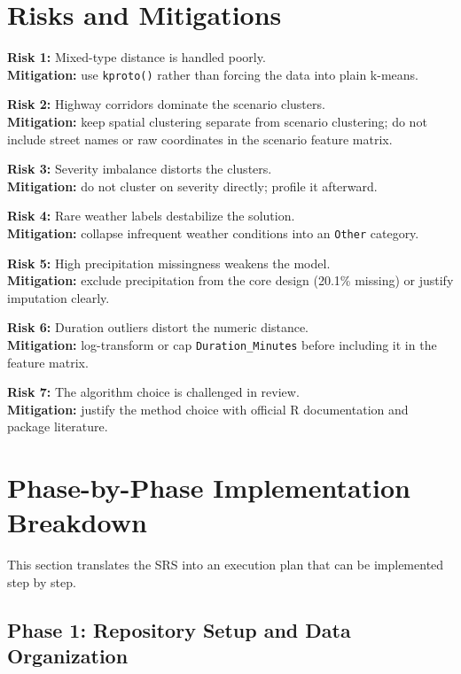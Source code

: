 \documentclass[11pt]{article}
\begin{document}
\section{Risks and Mitigations}

\textbf{Risk 1:} Mixed-type distance is handled poorly.\\
\textbf{Mitigation:} use \texttt{kproto()} rather than forcing the data into plain k-means.

\textbf{Risk 2:} Highway corridors dominate the scenario clusters.\\
\textbf{Mitigation:} keep spatial clustering separate from scenario clustering; do not include street names or raw coordinates in the scenario feature matrix.

\textbf{Risk 3:} Severity imbalance distorts the clusters.\\
\textbf{Mitigation:} do not cluster on severity directly; profile it afterward.

\textbf{Risk 4:} Rare weather labels destabilize the solution.\\
\textbf{Mitigation:} collapse infrequent weather conditions into an \texttt{Other} category.

\textbf{Risk 5:} High precipitation missingness weakens the model.\\
\textbf{Mitigation:} exclude precipitation from the core design (20.1\% missing) or justify imputation clearly.

\textbf{Risk 6:} Duration outliers distort the numeric distance.\\
\textbf{Mitigation:} log-transform or cap \texttt{Duration\_Minutes} before including it in the feature matrix.

\textbf{Risk 7:} The algorithm choice is challenged in review.\\
\textbf{Mitigation:} justify the method choice with official R documentation and package literature.

\section{Phase-by-Phase Implementation Breakdown}

This section translates the SRS into an execution plan that can be implemented step by step.

\subsection{Phase 1: Repository Setup and Data Organization}
\end{document}

